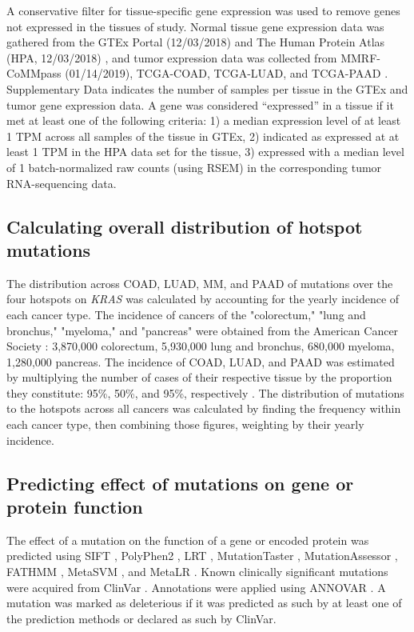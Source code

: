 \documentclass[english, 10pt, letterpaper]{article}
\newcommand{\KRAS}{\emph{KRAS}}
\begin{document}
A conservative filter for tissue-specific gene expression was used to remove genes not expressed in the tissues of study. 
Normal tissue gene expression data was gathered from the GTEx Portal (12/03/2018) \cite{GTExConsortium2017} and The Human Protein Atlas (HPA, 12/03/2018) \cite{Uhlen2015, Uhlen2016}, and tumor expression data was collected from MMRF-CoMMpass (01/14/2019), TCGA-COAD, TCGA-LUAD, and TCGA-PAAD \cite{Walker2019AAnalysis., CancerGenomeAtlasNetwork2012, CancerGenomeAtlasResearchNetwork2014, CancerGenomeAtlasResearchNetwork.Electronicaddress:andrew_aguirredfci.harvard.edu2017}. 
Supplementary Data indicates the number of samples per tissue in the GTEx and tumor gene expression data.
A gene was considered “expressed” in a tissue if it met at least one of the following criteria: 1) a median expression level of at least 1 TPM across all samples of the tissue in GTEx, 2) indicated as expressed at at least 1 TPM in the HPA data set for the tissue, 3) expressed with a median level of 1 batch-normalized raw counts (using RSEM) in the corresponding tumor RNA-sequencing data.


\subsection*{Calculating overall distribution of hotspot mutations}
The distribution across COAD, LUAD, MM, and PAAD of mutations over the four hotspots on \KRAS{} was calculated by accounting for the yearly incidence of each cancer type.
The incidence of cancers of the "colorectum," "lung and bronchus," "myeloma," and "pancreas" were obtained from the American Cancer Society \cite{Siegel2020Cancer2020.}: 3,870,000 colorectum, 5,930,000 lung and bronchus, 680,000 myeloma, 1,280,000 pancreas.
The incidence of COAD, LUAD, and PAAD was estimated by multiplying the number of cases of their respective tissue by the proportion they constitute: 95\%, 50\%, and 95\%, respectively \cite{Siegel2020Cancer2020., Meza2015Lung1973-2010.}.
The distribution of mutations to the hotspots across all cancers was calculated by finding the frequency within each cancer type, then combining those figures, weighting by their yearly incidence.


\subsection*{Predicting effect of mutations on gene or protein function}

The effect of a mutation on the function of a gene or encoded protein was predicted using SIFT \cite{Kumar2009, Vaser2016}, PolyPhen2 \cite{Adzhubei2010}, LRT \cite{Chun2009IdentificationGenomes.}, MutationTaster \cite{Schwarz2014MutationTaster2:Age.}, MutationAssessor \cite{Reva2007DeterminantsOptimization., Reva2011}, FATHMM \cite{Shihab2013}, MetaSVM \cite{Dong2015ComparisonStudies.}, and MetaLR \cite{Dong2015ComparisonStudies.}.
Known clinically significant mutations were acquired from ClinVar \cite{Landrum2018ClinVar:Evidence.}.
Annotations were applied using ANNOVAR \cite{Wang2010ANNOVAR:Data.}.
A mutation was marked as deleterious if it was predicted as such by at least one of the prediction methods or declared as such by ClinVar.
\end{document}
